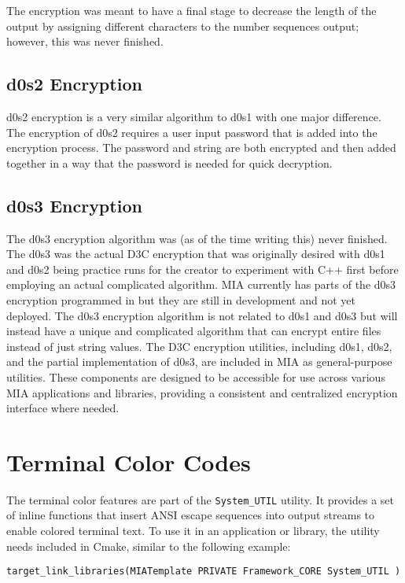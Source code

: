 The encryption was meant to have a final stage to decrease the length of the output by assigning different characters to the number sequences output; however, this was never finished.

\subsection{d0s2 Encryption}

d0s2 encryption is a very similar algorithm to d0s1 with one major difference. The encryption of d0s2 requires a user input password that is added into the encryption process. The password and string are both encrypted and then added together in a way that the password is needed for quick decryption.

\subsection{d0s3 Encryption}

The d0s3 encryption algorithm was (as of the time writing this) never finished. The d0s3 was the actual D3C encryption that was originally desired with d0s1 and d0s2 being practice runs for the creator to experiment with C++ first before employing an actual complicated algorithm. MIA currently has parts of the d0s3 encryption programmed in but they are still in development and not yet deployed. The d0s3 encryption algorithm is not related to d0s1 and d0s3 but will instead have a unique and complicated algorithm that can encrypt entire files instead of just string values. The D3C encryption utilities, including d0s1, d0s2, and the partial implementation of d0s3, are included in MIA as general-purpose utilities. These components are designed to be accessible for use across various MIA applications and libraries, providing a consistent and centralized encryption interface where needed.


















\section{Terminal Color Codes}

The terminal color features are part of the \texttt{System\_UTIL} utility. It provides a set of inline functions that insert ANSI escape sequences into output streams to enable colored terminal text. To use it in an application or library, the utility needs included in Cmake, similar to the following example:
\begin{lstlisting}[style=shellstyle]
target_link_libraries(MIATemplate PRIVATE Framework_CORE System_UTIL )
\end{lstlisting}

